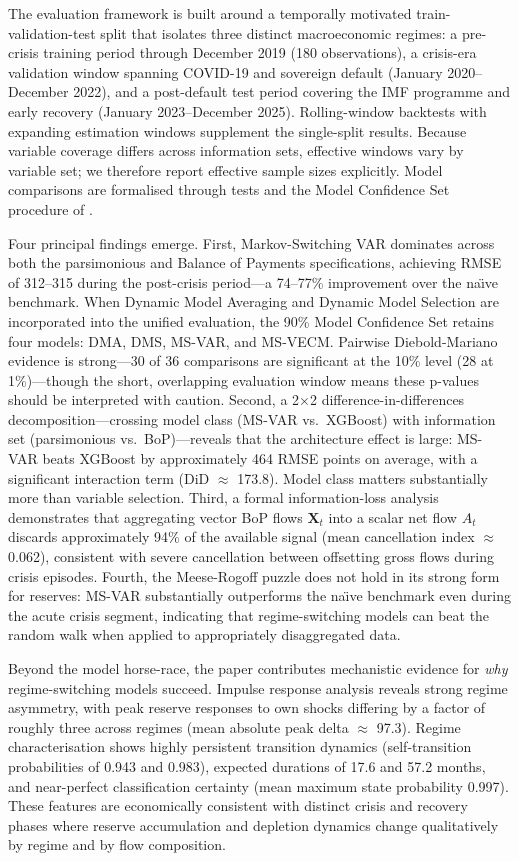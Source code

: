 \documentclass[12pt,a4paper]{article}
\begin{document}
The evaluation framework is built around a temporally motivated train-validation-test split that isolates three distinct macroeconomic regimes: a pre-crisis training period through December 2019 (180 observations), a crisis-era validation window spanning COVID-19 and sovereign default (January 2020--December 2022), and a post-default test period covering the IMF programme and early recovery (January 2023--December 2025). Rolling-window backtests with expanding estimation windows supplement the single-split results. Because variable coverage differs across information sets, effective windows vary by variable set; we therefore report effective sample sizes explicitly. Model comparisons are formalised through \cite{DieboldMariano1995} tests and the Model Confidence Set procedure of \cite{HansenLundeNason2011}.

Four principal findings emerge. First, Markov-Switching VAR dominates across both the parsimonious and Balance of Payments specifications, achieving RMSE of 312--315 during the post-crisis period---a 74--77\% improvement over the na\"{\i}ve benchmark. When Dynamic Model Averaging and Dynamic Model Selection are incorporated into the unified evaluation, the 90\% Model Confidence Set retains four models: DMA, DMS, MS-VAR, and MS-VECM. Pairwise Diebold-Mariano evidence is strong---30 of 36 comparisons are significant at the 10\% level (28 at 1\%)---though the short, overlapping evaluation window means these p-values should be interpreted with caution. Second, a 2$\times$2 difference-in-differences decomposition---crossing model class (MS-VAR vs.\ XGBoost) with information set (parsimonious vs.\ BoP)---reveals that the architecture effect is large: MS-VAR beats XGBoost by approximately 464 RMSE points on average, with a significant interaction term (DiD $\approx$ 173.8). Model class matters substantially more than variable selection. Third, a formal information-loss analysis demonstrates that aggregating vector BoP flows $\mathbf{X}_t$ into a scalar net flow $A_t$ discards approximately 94\% of the available signal (mean cancellation index $\approx$ 0.062), consistent with severe cancellation between offsetting gross flows during crisis episodes. Fourth, the Meese-Rogoff puzzle does not hold in its strong form for reserves: MS-VAR substantially outperforms the na\"{\i}ve benchmark even during the acute crisis segment, indicating that regime-switching models can beat the random walk when applied to appropriately disaggregated data.

Beyond the model horse-race, the paper contributes mechanistic evidence for \textit{why} regime-switching models succeed. Impulse response analysis reveals strong regime asymmetry, with peak reserve responses to own shocks differing by a factor of roughly three across regimes (mean absolute peak delta $\approx$ 97.3). Regime characterisation shows highly persistent transition dynamics (self-transition probabilities of 0.943 and 0.983), expected durations of 17.6 and 57.2 months, and near-perfect classification certainty (mean maximum state probability 0.997). These features are economically consistent with distinct crisis and recovery phases where reserve accumulation and depletion dynamics change qualitatively by regime and by flow composition.
\end{document}
